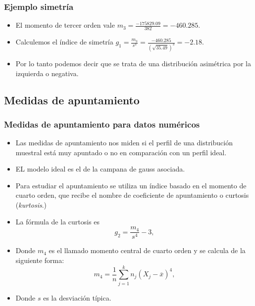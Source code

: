 \begin{frame}
\frametitle{Ejemplo simetría}
\begin{itemize}
\item El momento de tercer orden vale $m_3=\frac{-175829.09}{382}=-460.285$.
\item Calculemos el índice de simetría $g_1=\frac{m_3}{s^3}=\frac{-460.285}{\left(\sqrt{35.49}\right)^3}=-2.18$.
\item Por lo tanto podemos decir que se trata de una distribución asimétrica por la izquierda o
negativa.
\end{itemize}
\end{frame}



\subsection{Medidas de apuntamiento}

\begin{frame}
\frametitle{Medidas de apuntamiento para datos numéricos}
\begin{itemize}
\item Las medidas de apuntamiento nos miden si el perfil de una distribución muestral está muy
apuntado o no en comparación con un perfil ideal.
\item EL modelo ideal  es el de la campana de
gauss asociada.
\item  Para estudiar el apuntamiento se utiliza un índice basado en el momento
de cuarto orden, que recibe el nombre de coeficiente de apuntamiento o curtosis (\textsl{kurtosis}.)
\end{itemize}
\end{frame}

\begin{frame}
\begin{itemize}
\item La fórmula de la curtosis es
$$g_2=\frac{m_4}{s^4}-3,$$
\item Donde $m_4$ es el llamado momento central de cuarto orden y se calcula de la
siguiente forma:
$$
m_4 =\frac{1}{n} \sum\limits_{j=1}^{k} n_j(X_j - \overline{x})^4,
$$
\item Donde  $s$  es la desviación típica.
\end{itemize}
\end{frame}

